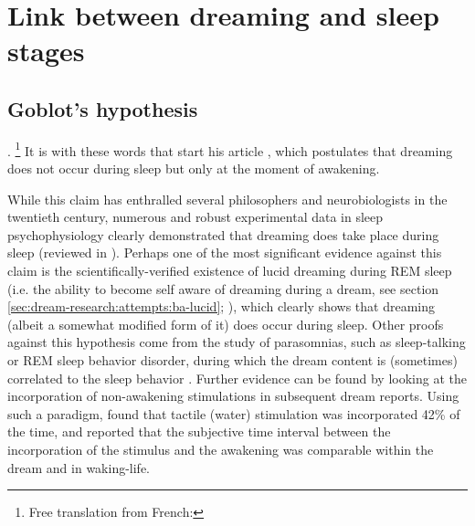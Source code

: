 \section{Link between dreaming and sleep stages}
\label{sec:dream-research:link}

\subsection{Goblot's hypothesis}
\label{sec:dream-research:link:goblot}

. \footnote{Free translation from French: } It is with these words that \citet{goblot_souvenir_1896} start his article , which postulates that dreaming does not occur during sleep but only at the moment of awakening.

While this claim has enthralled several philosophers and neurobiologists in the twentieth century, numerous and robust experimental data in sleep psychophysiology clearly demonstrated that dreaming does take place during sleep (reviewed in \citealp{guenole_reve_2010}). Perhaps one of the most significant evidence against this claim is the scientifically-verified existence of lucid dreaming during REM sleep (i.e. the ability to become self aware of dreaming during a dream, see section \ref{sec:dream-research:attempts:ba-lucid}; \citealp{laberge_exploring_1991, dresler_neural_2012}), which clearly shows that dreaming (albeit a somewhat modified form of it) does occur during sleep. Other proofs against this hypothesis come from the study of parasomnias, such as sleep-talking or REM sleep behavior disorder, during which the dream content is (sometimes) correlated to the sleep behavior \citep{ellman_mind_1991, schenck_rem_2002, leclair-visonneau_eyes_2010}. Further evidence can be found by looking at the incorporation of non-awakening stimulations in subsequent dream reports. Using such a paradigm, \citet{dement_relation_1958} found that tactile (water) stimulation was incorporated 42\% of the time, and reported that the subjective time interval between the incorporation of the stimulus and the awakening was comparable within the dream and in waking-life.

